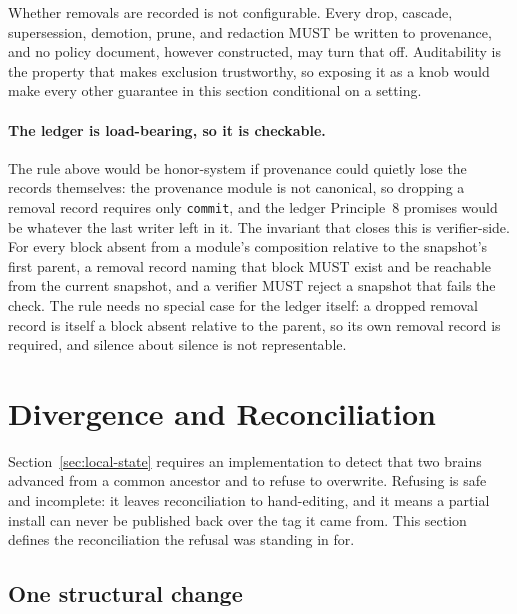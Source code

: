 \documentclass[11pt,a4paper]{article}
\begin{document}
\begin{callout}[title=One setting that does not exist]
Whether removals are recorded is not configurable. Every drop, cascade,
supersession, demotion, prune, and redaction MUST be written to provenance, and
no policy document, however constructed, may turn that off. Auditability is the
property that makes exclusion trustworthy, so exposing it as a knob would make
every other guarantee in this section conditional on a setting.
\end{callout}

\paragraph{The ledger is load-bearing, so it is checkable.}
The rule above would be honor-system if provenance could quietly lose the
records themselves: the provenance module is not canonical, so dropping a
removal record requires only \texttt{commit}, and the ledger Principle~8
promises would be whatever the last writer left in it. The invariant that
closes this is verifier-side. For every block absent from a module's
composition relative to the snapshot's first parent, a removal record naming
that block MUST exist and be reachable from the current snapshot, and a
verifier MUST reject a snapshot that fails the check. The rule needs no
special case for the ledger itself: a dropped removal record is itself a
block absent relative to the parent, so its own removal record is required,
and silence about silence is not representable.

\section{Divergence and Reconciliation}
\label{sec:divergence}

Section~\ref{sec:local-state} requires an implementation to detect that two
brains advanced from a common ancestor and to refuse to overwrite. Refusing is
safe and incomplete: it leaves reconciliation to hand-editing, and it means a
partial install can never be published back over the tag it came from. This
section defines the reconciliation the refusal was standing in for.

\subsection{One structural change}
\label{sec:parents-list}
\end{document}
